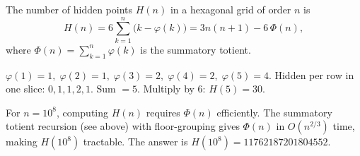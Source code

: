 \begin{theorem}
The number of hidden points $H(n)$ in a hexagonal grid of order $n$ is
\[
H(n) = 6\sum_{k=1}^{n}\bigl(k - \varphi(k)\bigr) = 3n(n+1) - 6\,\Phi(n),
\]
where $\Phi(n) = \sum_{k=1}^{n}\varphi(k)$ is the summatory totient.
\end{theorem}

\begin{example}[$n = 5$]
$\varphi(1)=1,\;\varphi(2)=1,\;\varphi(3)=2,\;\varphi(4)=2,\;\varphi(5)=4$.
Hidden per row in one slice: $0, 1, 1, 2, 1$. Sum $= 5$. Multiply by 6: $H(5) = 30$.
\end{example}

\begin{remark}
For $n = 10^8$, computing $H(n)$ requires $\Phi(n)$ efficiently. The summatory totient recursion (see above) with floor-grouping gives $\Phi(n)$ in $O(n^{2/3})$ time, making $H(10^8)$ tractable. The answer is $H(10^8) = 11762187201804552$.
\end{remark}

